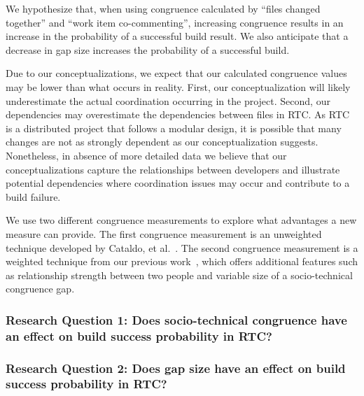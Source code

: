 We hypothesize that, when using congruence calculated by ``files changed together'' and ``work item co-commenting'', increasing congruence results in an increase in the probability of a successful build result. We also anticipate that a decrease in gap size increases the probability of a successful build.

Due to our conceptualizations, we expect that our calculated congruence values may be lower than what occurs in reality. First, our conceptualization will likely underestimate the actual coordination occurring in the project.
Second, our dependencies may overestimate the dependencies between files in RTC.
As RTC is a distributed project that follows a modular design, it is possible that many changes are not as strongly dependent as our conceptualization suggests. Nonetheless, in absence of more detailed data we believe that our conceptualizations capture the relationships between developers and illustrate potential dependencies where coordination issues may occur and contribute to a build failure.

We use two different congruence measurements to explore what advantages a new measure can provide. The first congruence measurement is an unweighted technique developed by Cataldo, et al.~\cite{cataldo2006:coordination_reqs}. The second congruence measurement is a weighted technique from our previous work~\cite{kwan2009:weighted}, which offers additional features such as relationship strength between two people and variable size of a socio-technical congruence gap.

\subsubsection*{Research Question 1: Does socio-technical congruence have an effect on build success probability in RTC?}

\vspace{6pt}

\subsubsection*{Research Question 2: Does gap size have an effect on build success probability in RTC?}

\vspace{6pt}

